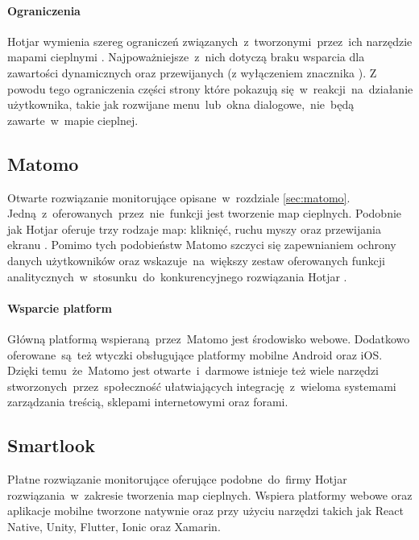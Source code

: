 \paragraph{Ograniczenia} 
Hotjar wymienia szereg ograniczeń związanych~z~tworzonymi~przez~ich narzędzie mapami cieplnymi \cite{Hotjar_limitations}. Najpoważniejsze~z~nich dotyczą braku wsparcia dla zawartości dynamicznych oraz przewijanych (z wyłączeniem znacznika ). Z powodu tego ograniczenia części strony które pokazują się~w~reakcji~na~działanie użytkownika, takie jak rozwijane menu~lub~okna dialogowe,~nie~będą zawarte~w~mapie cieplnej.

\subsection{Matomo}
Otwarte rozwiązanie monitorujące opisane~w~rozdziale \ref{sec:matomo}. Jedną~z~oferowanych~przez~nie~funkcji jest tworzenie map cieplnych. Podobnie jak Hotjar oferuje trzy rodzaje map: kliknięć, ruchu myszy oraz przewijania ekranu \cite{Matomo_heatmaps}. Pomimo tych podobieństw Matomo szczyci się zapewnianiem ochrony danych użytkowników oraz wskazuje~na~większy zestaw oferowanych funkcji analitycznych~w~stosunku~do~konkurencyjnego rozwiązania Hotjar \cite{Matomo_hotjar}.

\paragraph{Wsparcie platform} 
Główną platformą wspieraną~przez~Matomo jest środowisko webowe. Dodatkowo oferowane~są~też wtyczki obsługujące platformy mobilne Android oraz iOS. Dzięki temu~że~Matomo jest otwarte~i~darmowe istnieje też wiele narzędzi stworzonych~przez~społeczność ułatwiających integrację~z~wieloma systemami zarządzania treścią, sklepami internetowymi oraz forami.

\subsection{Smartlook}
Płatne rozwiązanie monitorujące oferujące podobne~do~firmy Hotjar rozwiązania~w~zakresie tworzenia map cieplnych. Wspiera platformy webowe oraz aplikacje mobilne tworzone natywnie oraz przy użyciu narzędzi takich jak React Native, Unity, Flutter, Ionic oraz Xamarin.
